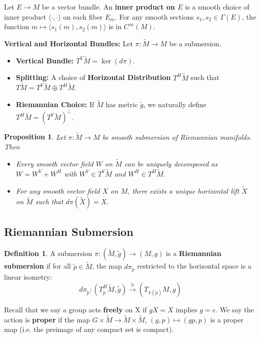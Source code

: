 \documentclass[11pt, a4paper]{article}
\theoremstyle{plain}
\newtheorem{proposition}[theorem]{Proposition}
\theoremstyle{definition}
\newtheorem{definition}[theorem]{Definition}
\theoremstyle{remark}
\begin{document}
Let $E \to M$ be a vector bundle. An \textbf{inner product on $E$} is a smooth choice of inner product $\langle \cdot, \cdot \rangle$ on each fiber $E_m$. For any smooth sections $s_1, s_2 \in \Gamma(E)$, the function $m \mapsto \langle s_1(m), s_2(m) \rangle$ is in $C^\infty(M)$.

\textbf{Vertical and Horizontal Bundles:}
Let $\pi: \tilde{M} \to M$ be a submersion.
\begin{itemize}
    \item \textbf{Vertical Bundle:} $T^V \tilde{M} = \ker(d\pi)$.
    \item \textbf{Splitting:} A choice of \textbf{Horizontal Distribution} $T^H \tilde{M}$ such that $T\tilde{M} = T^V \tilde{M} \oplus T^H \tilde{M}$.
    \item \textbf{Riemannian Choice:} If $\tilde{M}$ has metric $\tilde{g}$, we naturally define $T^H \tilde{M} = (T^V \tilde{M})^\perp$.
\end{itemize}

\begin{proposition}
    Let $\pi:\tilde{M}\to M$ be smooth submersion of Riemannian manifolds. Then
    \begin{itemize}
        \item Every smooth vector field $W$ on $\tilde{M}$ can be uniquely decomposed as $W = W^V + W^H$ with $W^V \in T^V \tilde{M}$ and $W^H \in T^H \tilde{M}$.
        \item For any smooth vector field $X$ on $M$, there exists a unique horizontal lift $\tilde{X}$ on $\tilde{M}$ such that $d\pi(\tilde{X}) = X$. 
    \end{itemize}
\end{proposition}

\subsection{Riemannian Submersion}

\begin{definition}
A submersion $\pi: (\tilde{M}, \tilde{g}) \to (M, g)$ is a \textbf{Riemannian submersion} if for all $\tilde{p} \in \tilde{M}$, the map $d\pi_{\tilde{p}}$ restricted to the horizontal space is a linear isometry:
\[ d\pi_{\tilde{p}}: (T^H_{\tilde{p}} \tilde{M}, \tilde{g}) \xrightarrow{\cong} (T_{\pi(\tilde{p})} M, g) \]
\end{definition}

Recall that we say a group acts \textbf{freely} on X if $gX = X$ implies $g = e$. We say the action is \textbf{proper} if the map $G \times \tilde{M} \to \tilde{M} \times \tilde{M}$, $(g, p) \mapsto (gp, p)$ is a proper map (i.e. the preimage of any compact set is compact).
\end{document}
